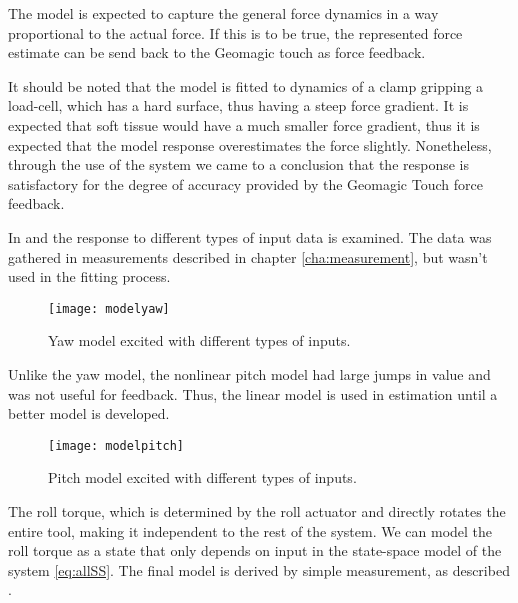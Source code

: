 
The model is expected to capture the general force dynamics in a way proportional to the actual force. If this is to be true, the represented force estimate can be send back to the Geomagic touch as force feedback.

It should be noted that the model is fitted to dynamics of a clamp gripping a load-cell, which has a hard surface, thus having a steep force gradient.
It is expected that soft tissue would have a much smaller force gradient, thus it is expected that the model response overestimates the force slightly.
Nonetheless, through the use of the system we came to a conclusion that the response is satisfactory for the degree of accuracy provided by the Geomagic Touch force feedback.

In  and  the response to different types of input data is examined.
The data was gathered in measurements described in chapter \ref{cha:measurement}, but wasn't used in the fitting process.


\begin{figure}[H]
\hspace{-3em}\texttt{[image: modelyaw]}
\caption{Yaw model excited with different types of inputs.}
\label{fig:final_res_yaw}
\end{figure}

Unlike the yaw model, the nonlinear pitch model had large jumps in value and was not useful for feedback.
Thus, the linear model is used in estimation until a better model is developed.

\begin{figure}[H]
\hspace{-2.5em}\texttt{[image: modelpitch]}
\caption{Pitch model excited with different types of inputs.}
\label{fig:final_res_pitch}
\end{figure}

The roll torque, which is determined by the roll actuator and directly rotates the entire tool, making it independent to the rest of the system.
We can model the roll torque as a state that only depends on input in the state-space model of the system \ref{eq:allSS}.
The final model is derived by simple measurement, as described .

